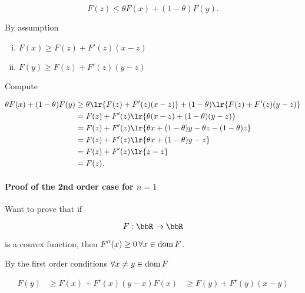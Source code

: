 \begin{dmath}\label{eqn:convexOptimizationLecture6:180}
F(z) \le \theta F(x) + (1-\theta) F(y).
\end{dmath}

By assumption

\begin{enumerate}[(i)]
\item \( F(x) \ge F(z) + F'(z) (x - z) \)
\item \( F(y) \ge F(z) + F'(z) (y - z) \)
\end{enumerate}

Compute

\begin{dmath}\label{eqn:convexOptimizationLecture6:200}
\begin{aligned}
\theta F(x) + (1-\theta) F(y)
&\ge
\theta \lr{  F(z) + F'(z) (x - z) }
+ (1-\theta) \lr{  F(z) + F'(z) (y - z) } \\
&=
F(z) + F'(z) \lr{ \theta( x - z) + (1-\theta) (y-z) } \\
&=
F(z) + F'(z) \lr{ \theta x  + (1-\theta) y - \theta z - (1 -\theta) z } \\
&=
F(z) + F'(z) \lr{ \theta x  + (1-\theta) y - z} \\
&=
F(z) + F'(z) \lr{ z - z} \\
&= F(z).
\end{aligned}
\end{dmath}

\paragraph{Proof of the 2nd order case for \( n = 1 \)}

Want to prove that if

\begin{equation}\label{eqn:convexOptimizationLecture6:240}
F : \bbR \rightarrow \bbR
\end{equation}

is a convex function, then \( F''(x) \ge 0 \,\forall x \in \operatorname{dom} F \).

By the first order conditions \( \forall x \ne y \in \operatorname{dom} F \)

\begin{dmath}\label{eqn:convexOptimizationLecture6:260}
\begin{aligned}
F(y) &\ge F(x) + F'(x) (y - x)
F(x) &\ge F(y) + F'(y) (x - y)
\end{aligned}
\end{dmath}

